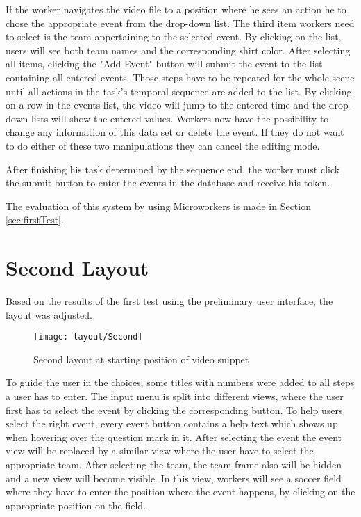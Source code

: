 If the worker navigates the video file to a position where he sees an action he to chose the appropriate event from the drop-down list. The third item workers need to select is the team appertaining to the selected event. By clicking on the list, users will see both team names and the corresponding shirt color.
After selecting all items, clicking the "Add Event" button will submit the event to the list containing all entered events.
\newline
Those steps have to be repeated for the whole scene until all actions in the task's temporal sequence are added to the list.
By clicking on a row in the events list, the video will jump to the entered time and the drop-down lists will show the entered values. Workers now have the possibility to change any information of this data set or delete the event. If they do not want to do either of these two manipulations they can cancel the editing mode.

After finishing his task determined by the sequence end, the worker must click the submit button to enter the events in the database and receive his token.

The evaluation of this system by using Microworkers is made in Section \ref{sec:firstTest}.

\newpage

\section{Second Layout}\label{sec:SecondLayout}

Based on the results of the first test using the preliminary user interface, the layout was adjusted.

\begin{figure}[H]
    \centering
    \texttt{[image: layout/Second]}
    \caption{Second layout at starting position of video snippet}
    \label{img:Layout2}
\end{figure}

To guide the user in the choices, some titles with numbers were added to all steps a user has to enter.
The input menu is split into different views, where the user first has to select the event by clicking the corresponding button. To help users select the right event, every event button contains a help text which shows up when hovering over the question mark in it.
After selecting the event the event view will be replaced by a similar view where the user have to select the appropriate team.
After selecting the team, the team frame also will be hidden and a new view will become visible. In this view, workers will see a soccer field where they have to enter the position where the event happens, by clicking on the appropriate position on the field.

